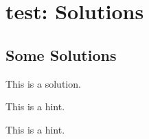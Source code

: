 \section{test: Solutions}
\subsection{Some Solutions}
\begin{Soln}{1}
         This is a solution.
         \relax{}
      
\end{Soln}
\begin{Hint}{2}
         This is a hint.
      
\end{Hint}
\begin{Hint}{3}
         This is a hint.
      
\end{Hint}
